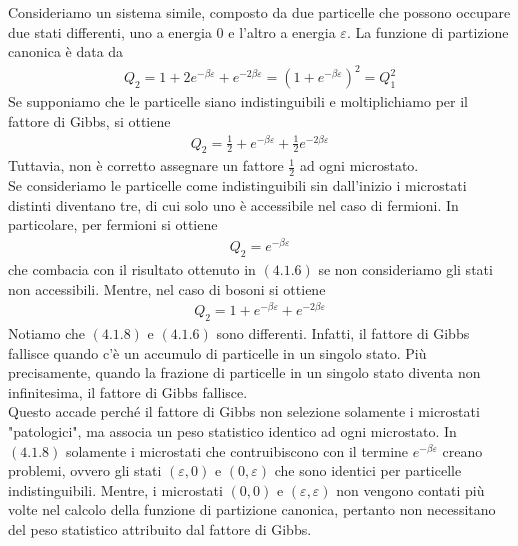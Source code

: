 \documentclass{article}
\begin{document}
Consideriamo un sistema simile, composto da due particelle che possono occupare due stati differenti, uno a energia $0$ e l'altro a energia $\varepsilon$. La funzione di partizione canonica è data da
\begin{align}
    Q_2 = 1 + 2e^{-\beta\varepsilon} + e^{-2\beta\varepsilon} = (1 + e^{-\beta\varepsilon})^2 = Q^2_1 \tag{4.1.5}
\end{align}
Se supponiamo che le particelle siano indistinguibili e moltiplichiamo per il fattore di Gibbs, si ottiene
\begin{align}
    Q_2 = \frac{1}{2} + e^{-\beta\varepsilon} + \frac{1}{2}e^{-2\beta\varepsilon} \tag{4.1.6}
\end{align}
Tuttavia, non è corretto assegnare un fattore $\frac{1}{2}$ ad ogni microstato. \\
Se consideriamo le particelle come indistinguibili sin dall'inizio i microstati distinti diventano tre, di cui solo uno è accessibile nel caso di fermioni. In particolare, per fermioni si ottiene
\begin{align}
    Q_2 = e^{-\beta\varepsilon} \tag{4.1.7}
\end{align}
che combacia con il risultato ottenuto in $(4.1.6)$ se non consideriamo gli stati non accessibili. Mentre, nel caso di bosoni si ottiene 
\begin{align}
    Q_2 = 1 + e^{-\beta\varepsilon} + e^{-2\beta\varepsilon} \tag{4.1.8}
\end{align}
Notiamo che $(4.1.8)$ e $(4.1.6)$ sono differenti. Infatti, il fattore di Gibbs fallisce quando c'è un accumulo di particelle in un singolo stato. Più precisamente, quando la frazione di particelle in un singolo stato diventa non infinitesima, il fattore di Gibbs fallisce. \\
Questo accade perché il fattore di Gibbs non selezione solamente i microstati "patologici", ma associa un peso statistico identico ad ogni microstato. In $(4.1.8)$ solamente i microstati che contruibiscono con il termine $e^{-\beta\varepsilon}$ creano problemi, ovvero gli stati $(\varepsilon, 0)$ e $(0, \varepsilon)$ che sono identici per particelle indistinguibili. Mentre, i microstati $(0, 0)$ e $(\varepsilon, \varepsilon)$ non vengono contati più volte nel calcolo della funzione di partizione canonica, pertanto non necessitano del peso statistico attribuito dal fattore di Gibbs.

\newpage
\end{document}
